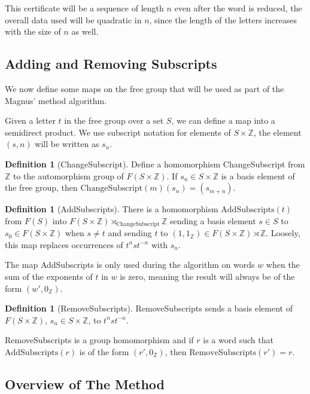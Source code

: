 \documentclass[12pt]{article} %
\theoremstyle{definition}
\theoremstyle{definition}
\theoremstyle{definition}
\theoremstyle{definition}
\theoremstyle{definition}
\newtheorem{defn}[theorem]{Definition}
\theoremstyle{definition}
\begin{document}
This certificate will be a sequence of length $n$ even after the word is reduced,
the overall data used will be quadratic in $n$, since the length of the letters
increases with the size of $n$ as well.

\subsection{Adding and Removing Subscripts}

We now define some maps on the free group that will be used as part of the Magnus'
method algorithm.

Given a letter $t$ in the free group over a set $S$, we can define a map into a
semidirect product. We use subscript notation for elements of $S \times \mathbb{Z}$,
the element $(s, n)$ will be written as $s_n$.

\begin{defn}[ChangeSubscript]\label{csub}
  Define a homomorphism ChangeSubscript from $\mathbb{Z}$ to the automorphism
  group of $F(S \times \mathbb{Z})$. If $s_n \in S \times \mathbb{Z}$ is a basis
  element of the free group, then $\text{ChangeSubscript}(m)(s_n) = (s_{m+n})$.
\end{defn}

\begin{defn}[AddSubscripts]\label{AddSubscripts}
  There is a homomorphism $\text{AddSubscripts}(t)$ from $F(S)$ into $F(S \times \mathbb{Z})
  \rtimes_{\text{ChangeSubscript}} \mathbb{Z}$ sending a basis element $s \in S$ to
  $s_0 \in F(S \times \mathbb{Z})$ when $s \ne t$ and sending $t$ to
  $(1, 1_\mathbb{Z}) \in F(S \times \mathbb{Z}) \rtimes \mathbb{Z}$. Loosely, this map
  replaces occurrences of $t^n s t^{-n}$ with $s_n$.
\end{defn}

The map AddSubscripts is only used during the algorithm on words $w$ when the sum of the
exponents of $t$ in $w$ is zero, meaning the result will always be of the form
$(w', 0_{\mathbb{Z}})$.

\begin{defn}[RemoveSubscripts]
  RemoveSubscripts sends a basis element of $F(S\times \mathbb{Z})$,  $s_n \in S\times \mathbb{Z}$,
  to $t^n s t^{-n}$.
\end{defn}
RemoveSubscripts is a group homomorphism and if $r$ is a word such that
$\text{AddSubscripts}(r)$ is of the form $(r', 0_\mathbb{Z})$,
then $\text{RemoveSubscripts}(r') = r$.

\subsection{Overview of The Method}
\end{document}
